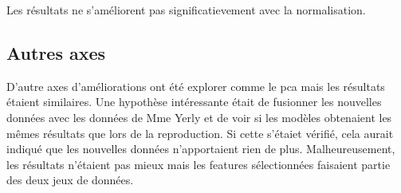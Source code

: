 Les résultats ne s'améliorent pas significatievement avec la normalisation.

\subsection{Autres axes}
D'autre axes d'améliorations ont été explorer comme le \acrfull{pca} mais les résultats étaient similaires.
Une hypothèse intéressante était de fusionner les nouvelles données avec les données de Mme Yerly et de voir si les modèles obtenaient les mêmes résultats que lors de la reproduction.
Si cette s'étaiet vérifié, cela aurait indiqué que les nouvelles données n'apportaient rien de plus.
Malheureusement, les résultats n'étaient pas mieux mais les features sélectionnées faisaient partie des deux jeux de données.


